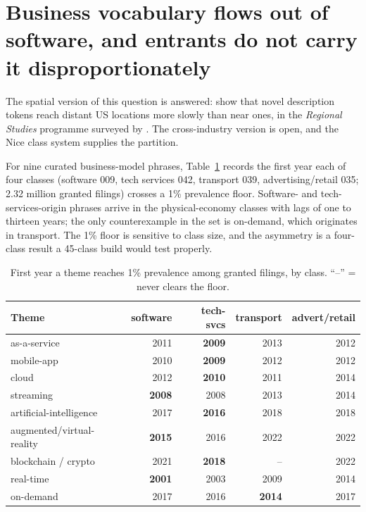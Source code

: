 \section{Business vocabulary flows out of software, and entrants do not carry it disproportionately}\label{sec:diffusion}

The spatial version of this question is answered: \citet{vonGraevenitz2022}
show that novel description tokens reach distant US locations more slowly
than near ones, in the \emph{Regional Studies} programme surveyed by
\citet{CastaldiMendonca2022}. The cross-industry version is open, and the
Nice class system supplies the partition.

For nine curated business-model phrases, Table~\ref{tab:transit} records
the first year each of four classes (software 009, tech services 042,
transport 039, advertising/retail 035; 2.32 million granted filings)
crosses a 1\% prevalence floor. Software- and tech-services-origin
phrases arrive in the physical-economy classes with lags of one to
thirteen years; the only counterexample in the set is on-demand, which
originates in transport. The 1\% floor is sensitive to class size, and
the asymmetry is a four-class result a 45-class build would test
properly.

\begin{table}[h]\centering\small
\caption{First year a theme reaches 1\% prevalence among granted filings,
by class. ``--'' = never clears the floor.}
\label{tab:transit}
\begin{tabular}{lrrrr}
\toprule
Theme & software & tech-svcs & transport & advert/retail \\
\midrule
as-a-service              & 2011 & \textbf{2009} & 2013 & 2012 \\
mobile-app                & 2010 & \textbf{2009} & 2012 & 2012 \\
cloud                     & 2012 & \textbf{2010} & 2011 & 2014 \\
streaming                 & \textbf{2008} & 2008 & 2013 & 2014 \\
artificial-intelligence   & 2017 & \textbf{2016} & 2018 & 2018 \\
augmented/virtual-reality & \textbf{2015} & 2016 & 2022 & 2022 \\
blockchain / crypto       & 2021 & \textbf{2018} & --   & 2022 \\
real-time                 & \textbf{2001} & 2003 & 2009 & 2014 \\
on-demand                 & 2017 & 2016 & \textbf{2014} & 2017 \\
\bottomrule
\end{tabular}
\end{table}

